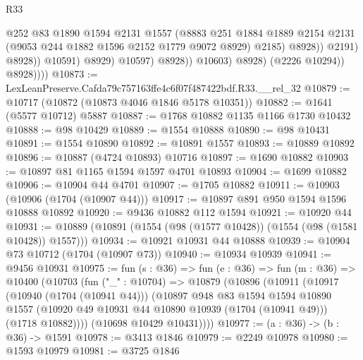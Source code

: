 \begin{lexlean}{R33}
\begin{coremodule}
                                      @252
                                      @83
                                      @1890
                                      @1594
                                      @2131
                                      @1557
                                      (@8883
                                        @251
                                        @1884
                                        @1889
                                        @2154
                                        @2131
                                        (@9053 @244 @1882 @1596 @2152 @1779 @9072 @8929)
                                        @2185)
                                      @8928))
                                  @2191)
                                @8928))
                            @10591)
                          @8929)
                        @10597)
                      @8928))
                  @10603)
                @8928)
              (@2226 @10294))
            @8928))))
@10873 := LexLeanPreserve.Cafda79c757163ffe4c6f07f487422bdf.R33.__rel_32
@10879 := @10717 (@10872 (@10873 @4046 @1846 @5178 @10351))
@10882 := @1641 (@5577 @10712) @5887
@10887 := @1768 @10882 @1135 @1166 @1730 @10432
@10888 := @98 @10429
@10889 := @1554 @10888
@10890 := @98 @10431
@10891 := @1554 @10890
@10892 := @10891 @1557
@10893 := @10889 @10892
@10896 := @10887 (@4724 @10893) @10716
@10897 := @1690 @10882
@10903 := @10897 @81 @1165 @1594 @1597 @4701 @10893
@10904 := @1699 @10882
@10906 := @10904 @44 @4701
@10907 := @1705 @10882
@10911 := @10903 (@10906 (@1704 (@10907 @44)))
@10917 := @10897 @891 @950 @1594 @1596 @10888 @10892
@10920 := @9436 @10882 @112 @1594
@10921 := @10920 @44
@10931 := @10889 (@10891 (@1554 (@98 (@1577 @10428)) (@1554 (@98 (@1581 @10428)) @1557)))
@10934 := @10921 @10931 @44 @10888
@10939 := @10904 @73 @10712 (@1704 (@10907 @73))
@10940 := @10934 @10939
@10941 := @9456 @10931
@10975 := fun (s : @36) =>
  fun (e : @36) =>
  fun (m : @36) =>
  @10400
    (@10703
      (fun ("_" : @10704) =>
      @10879
        (@10896
          (@10911
            (@10917
              (@10940 (@1704 (@10941 @44)))
              (@10897
                @948
                @83
                @1594
                @1594
                @10890
                @1557
                (@10920 @49 @10931 @44 @10890 @10939 (@1704 (@10941 @49)))
                (@1718 @10882))))
          (@10698 @10429 @10431))))
@10977 := (a : @36) -> (b : @36) -> @1591
@10978 := @3413 @1846
@10979 := @2249 @10978
@10980 := @1593 @10979
@10981 := @3725 @1846

\end{coremodule}
\end{lexlean}
